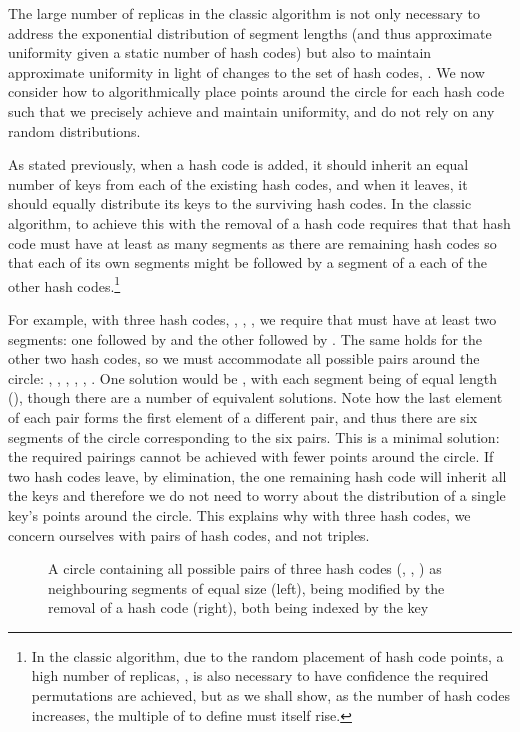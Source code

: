 \documentclass[runningheads,a4paper]{llncs}
\begin{document}
The large number of replicas in the classic algorithm is not only
necessary to address the exponential distribution of segment lengths
(and thus approximate uniformity given a static number of hash codes)
but also to maintain approximate uniformity in light of changes to the
set of hash codes, . We now consider how to algorithmically place
points around the circle for each hash code such that we precisely
achieve and maintain uniformity, and do not rely on any random
distributions.

As stated previously, when a hash code is added, it should inherit an
equal number of keys from each of the existing hash codes, and when it
leaves, it should equally distribute its keys to the surviving hash
codes. In the classic algorithm, to achieve this with the removal of a
hash code requires that that hash code must have at least as many
segments as there are remaining hash codes so that each of its own
segments might be followed by a segment of a each of the other hash
codes.\footnote{In the classic algorithm, due to the random placement
  of hash code points, a high number of replicas, , is also
  necessary to have confidence the required permutations are achieved,
  but as we shall show, as the number of hash codes increases, the
  multiple of  to define  must itself rise.}

For example, with three hash codes, , , , we
require that  must have at least two segments: one followed by
 and the other followed by . The same holds for the
other two hash codes, so we must accommodate all possible pairs around
the circle: , , ,
, , . One solution
would be , with each
segment being of equal length (), though
there are a number of equivalent solutions. Note how the last element
of each pair forms the first element of a different pair, and thus
there are six segments of the circle corresponding to the six
pairs. This is a minimal solution: the required pairings cannot be
achieved with fewer points around the circle. If two hash codes leave,
by elimination, the one remaining hash code will inherit all the keys
and therefore we do not need to worry about the distribution of a
single key's points around the circle. This explains why with three
hash codes, we concern ourselves with pairs of hash codes, and not
triples.

\begin{figure}
\begin{center}

\end{center}
\caption{A circle containing all possible pairs of three hash codes
  (, , ) as neighbouring segments of equal size
  (left), being modified by the removal of a hash code 
  (right), both being indexed by the key }
\label{fig:circle-perfect-3}
\end{figure}
\end{document}

